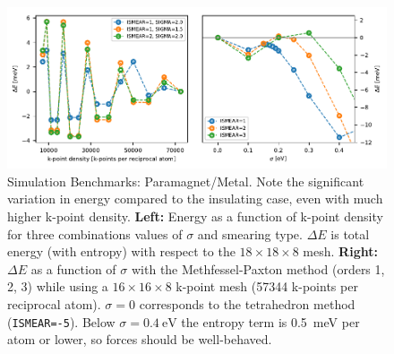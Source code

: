 \begin{figure}
    \centering
    \includegraphics[width=\textwidth]{fig/simulation/convergence_metal.pdf}
    \caption[Simulation Benchmarks: Paramagnet/Metal]{Simulation Benchmarks: Paramagnet/Metal. Note the significant variation in energy compared to the insulating case, even with much higher k-point density. \textbf{Left:} Energy as a function of k-point density for three combinations values of $\sigma$ and smearing type. $\Delta E$ is total energy (with entropy) with respect to the $18 \times 18 \times 8$ mesh. \textbf{Right:} $\Delta E$ as a function of $\sigma$ with the Methfessel-Paxton method (orders 1, 2, 3) while using a $16 \times 16 \times 8$ k-point mesh (57344 k-points per reciprocal atom). $\sigma=0$ corresponds to the tetrahedron method (\texttt{ISMEAR=-5}). Below $\sigma = \SI{0.4}{\eV}$ the entropy term is \SI{0.5}{\milli\eV} per atom or lower, so forces should be well-behaved.}
    \label{fig:sim_bench_para}
\end{figure}

